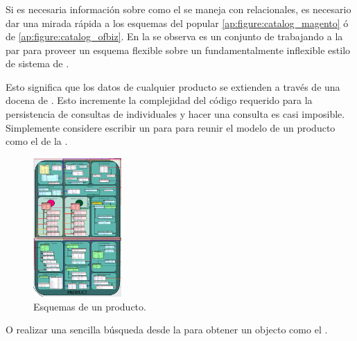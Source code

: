 \subsubsection{\catalogManagement}

Si es necesaria información sobre como el \catalogManagement se maneja con \dataBasesDB relacionales, es necesario dar una mirada rápida a los esquemas del popular \nameMagento \ecommerce \frameworkPC \ref{ap:figure:catalog_magento} ó \ofBizNAME de \apacheNAME \ref{ap:figure:catalog_ofbiz}. En la   se observa es un conjunto de \tablesDB trabajando a la par para proveer un esquema flexible sobre un fundamentalmente inflexible estilo de sistema de \dataBaseDB.

Esto significa que los datos de cualquier producto se extienden a través de una docena de \tablesDB. Esto incremente la complejidad del código requerido para la persistencia de consultas de \itemsCOM individuales y hacer una consulta \shellBased es casi imposible. Simplemente considere escribir un \sqlNAME \join para para reunir el modelo de un producto como el de la .

\begin{figure}[h!]
	\centering
	\includegraphics[width=0.3\textwidth]{figuras/cap2/magento_product_schema.png}
	\caption{Esquemas de un producto.}
	\label{cap:figure:catalog_magento}
\end{figure}

O realizar una sencilla búsqueda desde la \shell \mongodbNAME \javaScriptNAME  para obtener un objecto \jsonNAME como el .

